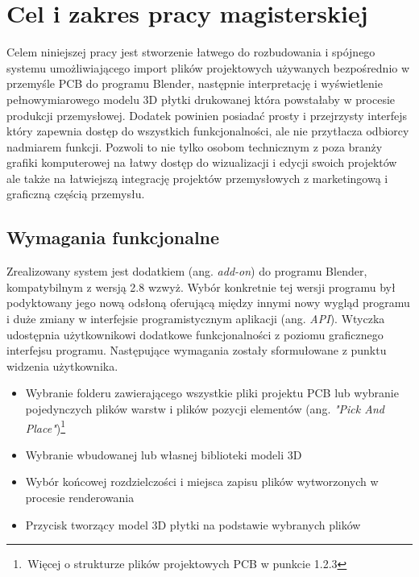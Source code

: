 \documentclass[brudnopis]{xmgr}
\begin{document}

\chapter{Cel i zakres pracy magisterskiej}

Celem niniejszej pracy jest stworzenie łatwego do rozbudowania i spójnego systemu umożliwiającego import plików projektowych używanych bezpośrednio w przemyśle PCB do programu Blender, następnie interpretację i wyświetlenie pełnowymiarowego modelu 3D płytki drukowanej która powstałaby w procesie produkcji przemysłowej. Dodatek powinien posiadać prosty i przejrzysty interfejs który zapewnia dostęp do wszystkich funkcjonalności, ale nie przytłacza odbiorcy nadmiarem funkcji. Pozwoli to nie tylko osobom technicznym z poza branży grafiki komputerowej na łatwy dostęp do wizualizacji i edycji swoich projektów ale także na łatwiejszą integrację projektów przemysłowych z marketingową i graficzną częścią przemysłu.

\section{Wymagania funkcjonalne}

Zrealizowany system jest dodatkiem (ang. \emph{add-on}) do programu Blender, kompatybilnym z wersją 2.8 wzwyż. Wybór konkretnie tej wersji programu był podyktowany jego nową odsłoną oferującą między innymi nowy wygląd programu i duże zmiany w interfejsie programistycznym aplikacji (ang. \emph{API}). Wtyczka udostępnia użytkownikowi dodatkowe funkcjonalności z poziomu graficznego interfejsu programu. Następujące wymagania zostały sformułowane z punktu widzenia użytkownika.
\begin{itemize}
\item Wybranie folderu zawierającego wszystkie pliki projektu PCB lub wybranie pojedynczych plików warstw i  plików pozycji elementów (ang. \emph{"Pick And Place"})\footnote{\,Więcej o strukturze plików projektowych PCB w punkcie 1.2.3}
\item Wybranie wbudowanej lub własnej biblioteki modeli 3D
\item Wybór końcowej rozdzielczości i miejsca zapisu plików wytworzonych w procesie renderowania
\item Przycisk tworzący model 3D płytki na podstawie wybranych plików
\end{itemize}
\end{document}

